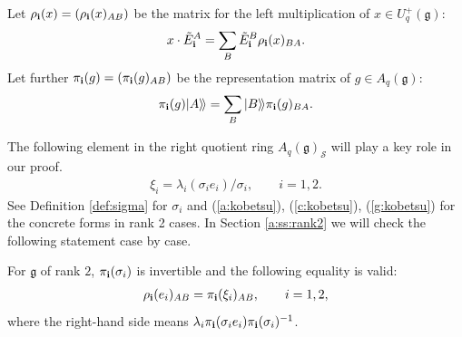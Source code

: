 \documentclass[pdftex]{sigma}
\newcommand{\geh}{\mathfrak{g}}
\begin{document}
Let $\rho_{\bf i}(x)=(\rho_{\bf i}(x)_{A B})$ be the matrix
for the left multiplication of  $x \in U^+_q(\geh)$:
\begin{gather}\label{a:lmul}
x \cdot {\tilde E}^{A}_{\bf i} = \sum_B  {\tilde E}^B_{\bf i}
\rho_{\bf i}(x)_{BA}.
\end{gather}
Let further $\pi_{\bf i}(g)=(\pi_{\bf i}(g)_{A B})$ be the
representation matrix of $g \in A_q(\geh)$:
\begin{gather}\label{a:pib}
\pi_{\bf i}(g) | A\rangle\!\rangle
= \sum_B |B\rangle\!\rangle \pi_{\bf i}(g)_{BA}.
\end{gather}

The following element in
the right quotient ring $A_q(\geh)_\mathcal{S}$
will play a key role in our proof.
\begin{gather}\label{a:xidef}
\xi_i = \lambda_i (\sigma_i e_i)/\sigma_i,\qquad i=1,2.
\end{gather}
See Def\/inition \ref{def:sigma} for $\sigma_i$
and (\ref{a:kobetsu}),  (\ref{c:kobetsu}),  (\ref{g:kobetsu})
for the concrete forms in rank 2 cases.
In Section \ref{a:ss:rank2} we will check
the following statement case by case.
\begin{proposition}\label{a:pr:rnk2}
For $\geh$ of rank $2$,
$\pi_{\bf i}(\sigma_i)$ is invertible and
the following equality is valid:
\begin{gather}\label{a:key}
\rho_{\bf i}(e_i)_{A B} = \pi_{\bf i}(\xi_i)_{A B}, \qquad i=1,2,
\end{gather}
where the right-hand side means
$\lambda_i\pi_{\bf i}(\sigma_ie_i) \pi_{\bf i}(\sigma_i)^{-1}$.
\end{proposition}
\end{document}
